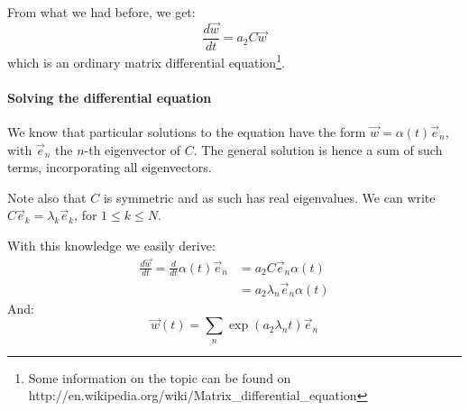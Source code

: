 \documentclass[11pt]{article}
\begin{document}
From what we had before, we get:
\[ \frac{d\vec{w}}{dt} = a_2 C \vec{w}\]
which is an ordinary matrix differential equation\footnote{Some information on the topic can be found on http://en.wikipedia.org/wiki/Matrix\_differential\_equation}.

\paragraph{Solving the differential equation}
We know that particular solutions to the equation have the form $\vec{w} = \alpha (t) \vec{e}_n$, with $\vec{e}_n$ the $n$-th eigenvector of $C$. The general solution is hence a sum of such terms, incorporating all eigenvectors.

Note also that $C$ is symmetric and as such has real eigenvalues. We can write $C\vec{e}_k = \lambda_k\vec{e}_k$, for $1\leq k \leq N$.

With this knowledge we easily derive:
\begin{align*}
\frac{d\vec{w}}{dt} = \frac{d}{dt}\alpha(t)\vec{e}_n &= a_2 C \vec{e}_n \alpha(t) \\
&=a_2 \lambda_n \vec{e}_n \alpha(t)
\end{align*}
And:
\[\vec{w}(t) = \sum_n \exp(a_2 \lambda_n t) \vec{e}_n\]
\end{document}
